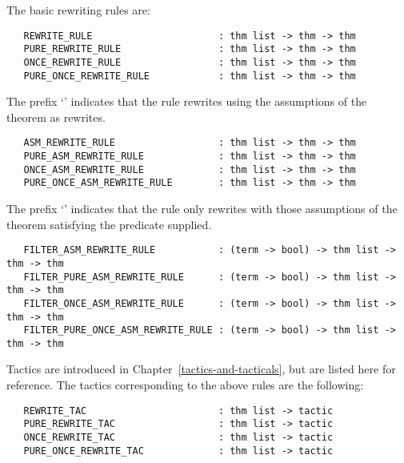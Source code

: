The basic rewriting rules are:

\begin{hol}\begin{verbatim}
   REWRITE_RULE                      : thm list -> thm -> thm
   PURE_REWRITE_RULE                 : thm list -> thm -> thm
   ONCE_REWRITE_RULE                 : thm list -> thm -> thm
   PURE_ONCE_REWRITE_RULE            : thm list -> thm -> thm
\end{verbatim}\end{hol}

\noindent The prefix `'
indicates that the rule rewrites using the assumptions
of the theorem as rewrites.

\begin{hol}\begin{verbatim}
   ASM_REWRITE_RULE                  : thm list -> thm -> thm
   PURE_ASM_REWRITE_RULE             : thm list -> thm -> thm
   ONCE_ASM_REWRITE_RULE             : thm list -> thm -> thm
   PURE_ONCE_ASM_REWRITE_RULE        : thm list -> thm -> thm
\end{verbatim}\end{hol}

\noindent The prefix `'
indicates that the rule only rewrites with
those assumptions of the theorem satisfying the predicate supplied.

\begin{hol}\begin{verbatim}
   FILTER_ASM_REWRITE_RULE           : (term -> bool) -> thm list -> thm -> thm
   FILTER_PURE_ASM_REWRITE_RULE      : (term -> bool) -> thm list -> thm -> thm
   FILTER_ONCE_ASM_REWRITE_RULE      : (term -> bool) -> thm list -> thm -> thm
   FILTER_PURE_ONCE_ASM_REWRITE_RULE : (term -> bool) -> thm list -> thm -> thm
\end{verbatim}\end{hol}

\noindent Tactics are introduced in Chapter~\ref{tactics-and-tacticals},
but are listed here for reference.
The tactics corresponding to the above rules are the following:

\begin{hol}\begin{verbatim}
   REWRITE_TAC                       : thm list -> tactic
   PURE_REWRITE_TAC                  : thm list -> tactic
   ONCE_REWRITE_TAC                  : thm list -> tactic
   PURE_ONCE_REWRITE_TAC             : thm list -> tactic
\end{verbatim}\end{hol}

